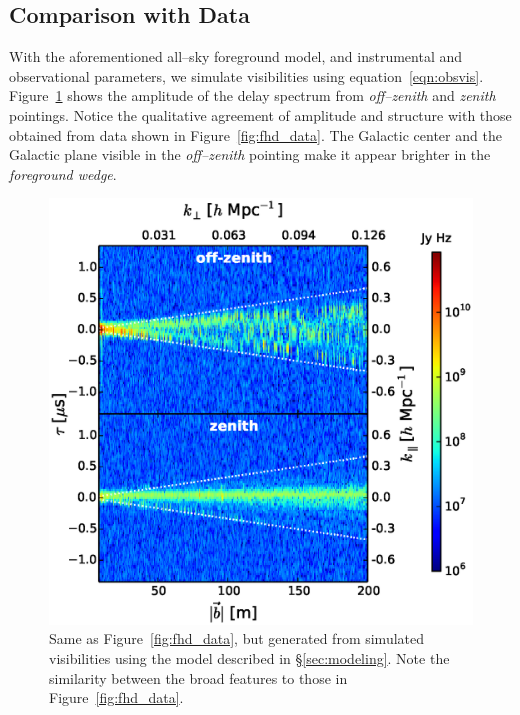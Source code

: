 \documentclass[preprint2,iop,numberedappendix]{emulateapj}
\begin{document}
\subsection{Comparison with Data}\label{sec:data-vs-model}

With the aforementioned all--sky foreground model, and instrumental and observational parameters, we simulate visibilities using equation~\ref{eqn:obsvis}. Figure~\ref{fig:sim_data} shows the amplitude of the delay spectrum from {\it off--zenith} and {\it zenith} pointings. Notice the qualitative agreement of amplitude and structure with those obtained from data shown in Figure~\ref{fig:fhd_data}. The Galactic center and the Galactic plane visible in the {\it off--zenith} pointing make it appear brighter in the {\it foreground wedge}. 

\begin{figure}[htb]
\centering
\includegraphics[width=\linewidth]{figures/v1_0/multi_baseline_sim_delay_spectrum_snapshots.eps}
\caption{Same as Figure~\ref{fig:fhd_data}, but generated from simulated visibilities using the model described in \S\ref{sec:modeling}. Note the similarity between the broad features to those in Figure~\ref{fig:fhd_data}. \label{fig:sim_data}}
\end{figure}
\end{document}
